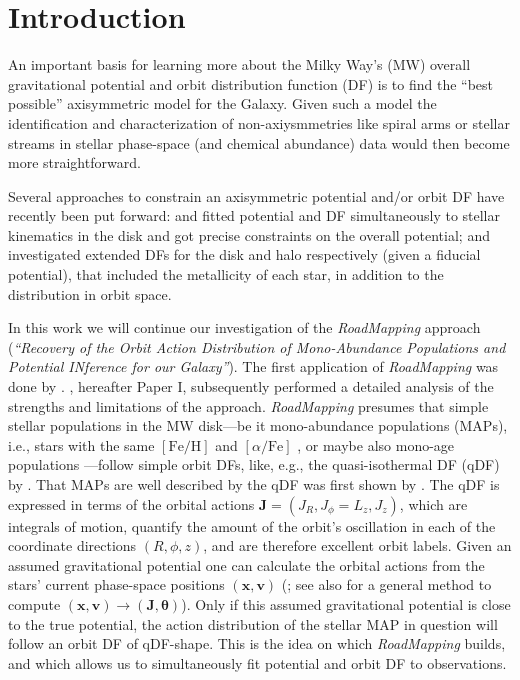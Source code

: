 \documentclass[iop,revtex4,numberedappendix,appendixfloats]{emulateapj}
\newcommand{\vect}[1]{\boldsymbol{#1}}
\newcommand{\RM}{{\sl RoadMapping}}
\begin{document}
\section{Introduction} \label{sec:intro}

An important basis for learning more about the Milky Way's (MW) overall gravitational potential and orbit distribution function (DF) is to find the ``best possible'' axisymmetric model for the Galaxy. Given such a model the identification and characterization of non-axiysmmetries like spiral arms or stellar streams in stellar phase-space (and chemical abundance) data would then become more straightforward.

Several approaches to constrain an axisymmetric potential and/or orbit DF have recently been put forward: \citet{2013ApJ...779..115B} and \citet{2014MNRAS.445.3133P} fitted potential and DF simultaneously to stellar kinematics in the disk and got precise constraints on the overall potential; \citet{2015MNRAS.449.3479S} and \citet{2016MNRAS.460.1725D} investigated extended DFs for the disk and halo respectively (given a fiducial potential), that included the metallicity of each star, in addition to the distribution in orbit space.

In this work we will continue our investigation of the \RM{} approach (\emph{``Recovery of the Orbit Action Distribution of Mono-Abundance Populations and Potential INference for our Galaxy''}). The first application of \RM{} was done by \citet{2013ApJ...779..115B}. \citet{2016ApJ...830...97T}, hereafter Paper I, subsequently performed a detailed analysis of the strengths and limitations of the approach. \RM{} presumes that simple stellar populations in the MW disk---be it mono-abundance populations (MAPs), i.e., stars with the same $[\mathrm{Fe}/\mathrm{H}]$ and $[\alpha/\mathrm{Fe}]$ \citep{2012ApJ...751..131B,2012ApJ...753..148B,2012ApJ...755..115B,2016ApJ...823...30B}, or maybe also mono-age populations \citep{2013ApJ...773...43B,2014MNRAS.442.2474M,2016MNRAS.456.3655M,2014A&A...572A..92M,2016ApJ...823..114N}---follow simple orbit DFs, like, e.g., the quasi-isothermal DF (qDF) by \citet{2011MNRAS.413.1889B}. That MAPs are well described by the qDF was first shown by \citep{2013MNRAS.434..652T}. The qDF is expressed in terms of the orbital actions $\vect{J}=(J_R,J_\phi=L_z,J_z)$, which are integrals of motion, quantify the amount of the orbit's oscillation in each of the coordinate directions $(R,\phi,z)$, and are therefore excellent orbit labels. Given an assumed gravitational potential one can calculate the orbital actions from the stars' current phase-space positions $(\vect{x},\vect{v})$ (\citealt{2012MNRAS.426.1324B,2016MNRAS.457.2107S}; see also \citet{2014ApJ...795...95B} for a general method to compute $(\vect{x},\vect{v})\longrightarrow(\vect{J},\vect{\theta})$). Only if this assumed gravitational potential is close to the true potential, the action distribution of the stellar MAP in question will follow an orbit DF of qDF-shape. This is the idea on which \RM{} builds, and which allows us to simultaneously fit potential and orbit DF to observations.
\end{document}
